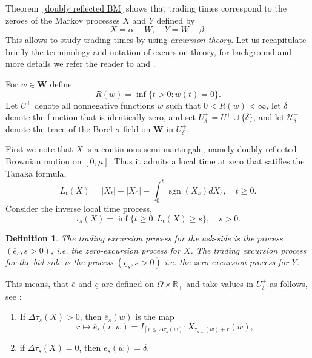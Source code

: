 \documentclass[11pt]{scrartcl}
\newtheorem{definition}[theorem]{Definition}
\DeclareMathOperator{\sgn}{sgn}
\begin{document}
Theorem~\ref{doubly reflected BM} shows that trading times correspond to the
zeroes of the Markov processes $X$ and $Y$ defined by 
\begin{equation}
X=\alpha -W,\quad Y=W-\beta .
\end{equation}
This allows to study trading times by using \emph{excursion theory}. Let us
recapitulate briefly the terminology and notation of excursion theory, for
background and more details we refer the reader to \cite[Ch.XII]{RY} and 
\cite{Blu}.

For $w\in\mathbf{W}$ define 
\begin{equation}
R(w)=\inf\{t>0:w(t)=0\}.
\end{equation}
Let $U^+$ denote all nonnegative functions $w$ such that $0<R(w)<\infty$,
let $\delta$ denote the function that is identically zero, and set $U^+_\delta=U^+\cup\{\delta\}$, and let $\mathcal{U}^+_\delta$ denote the trace
of the Borel $\sigma$-field on $\mathbf{W}$ in $U^+_\delta$.

First we note that $X$ is a continuous semi-martingale, namely doubly
reflected Brownian motion on $[0,\mu ]$. Thus it admits a local time at zero
that satifies the Tanaka formula, 
\begin{equation}
L_{t}(X)=|X_{t}|-|X_{0}|-\int_{0}^{t}\sgn(X_{s})dX_{s},\quad t\geq 0.
\end{equation}
Consider the inverse local time process, 
\begin{equation}
\tau _{s}(X)=\inf \{t\geq 0:L_{t}(X)\geq s\},\quad s>0.
\end{equation}

\begin{definition}
The \emph{trading excursion process for the ask-side} is the process $(\overline{e}_{s},s>0)$, 
i.e. the zero-excursion process for $X$. The \emph{trading excursion process for the bid-side} is the 
process $(\underline{e}_{s},s>0)$ i.e. the zero-excursion process for $Y$.
\end{definition}

This means, that $\overline{e}$ and $\underline{e}$ are defined 
on $\Omega\times\mathbb R_+$ and take values in $U_\delta^+$ as
follows, see \cite[Def.XII.2.1, p.480]{RY}:

\begin{enumerate}
\item If $\Delta \tau _{s}(X)>0$, then $\overline{e}_{s}(w)$ is the map 
\begin{equation}
r\mapsto \overline{e}_{s}(r,w)=I_{[r\leq \Delta \tau _{s}(w)]}X_{\tau
_{s-}(w)+r}(w),
\end{equation}

\item if $\Delta \tau _{s}(X)=0$, then $\overline{e}_{s}(w)=\delta .$
\end{enumerate}
\end{document}
